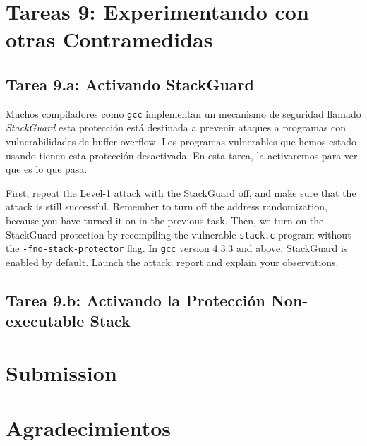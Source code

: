 \section{Tareas 9: Experimentando con otras Contramedidas}


\subsection{Tarea 9.a: Activando StackGuard}

Muchos compiladores como \texttt{gcc} implementan un mecanismo de seguridad llamado \textit{StackGuard} esta protección está destinada a prevenir ataques a programas con vulnerabilidades de buffer overflow. Los programas vulnerables que hemos estado usando tienen esta protección desactivada. 
En esta tarea, la activaremos para ver que es lo que pasa.

First, repeat the Level-1 attack with the StackGuard off, and make sure that the
attack is still successful. Remember to turn off the address randomization, because
you have turned it on in the previous task.
Then, we turn on the StackGuard protection by
recompiling the vulnerable \texttt{stack.c} program without the
\texttt{-fno-stack-protector} flag.
In \texttt{gcc} version 4.3.3 and above, StackGuard is enabled by
default. Launch the attack; report and explain your observations.



\subsection{Tarea 9.b: Activando la Protección Non-executable Stack}





\section{Submission}




\section*{Agradecimientos}




